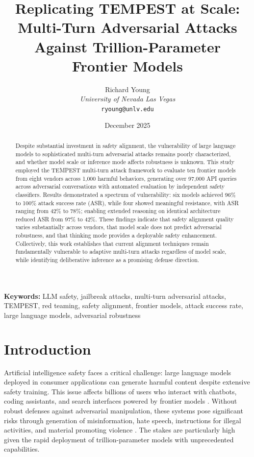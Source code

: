 \documentclass[11pt,a4paper]{article}
\title{\textbf{Replicating TEMPEST at Scale: Multi-Turn Adversarial Attacks Against Trillion-Parameter Frontier Models}}
\author{
Richard Young\\
\textit{University of Nevada Las Vegas}\\
\texttt{ryoung@unlv.edu}
}
\date{December 2025}
\begin{document}
\maketitle

\begin{abstract}
Despite substantial investment in safety alignment, the vulnerability of large language models to sophisticated multi-turn adversarial attacks remains poorly characterized, and whether model scale or inference mode affects robustness is unknown. This study employed the TEMPEST multi-turn attack framework to evaluate ten frontier models from eight vendors across 1,000 harmful behaviors, generating over 97,000 API queries across adversarial conversations with automated evaluation by independent safety classifiers. Results demonstrated a spectrum of vulnerability: six models achieved 96\% to 100\% attack success rate (ASR), while four showed meaningful resistance, with ASR ranging from 42\% to 78\%; enabling extended reasoning on identical architecture reduced ASR from 97\% to 42\%. These findings indicate that safety alignment quality varies substantially across vendors, that model scale does not predict adversarial robustness, and that thinking mode provides a deployable safety enhancement. Collectively, this work establishes that current alignment techniques remain fundamentally vulnerable to adaptive multi-turn attacks regardless of model scale, while identifying deliberative inference as a promising defense direction.
\end{abstract}

\vspace{0.5em}
\noindent\textbf{Keywords:} LLM safety, jailbreak attacks, multi-turn adversarial attacks, TEMPEST, red teaming, safety alignment, frontier models, attack success rate, large language models, adversarial robustness

\section{Introduction}

Artificial intelligence safety faces a critical challenge: large language models deployed in consumer applications can generate harmful content despite extensive safety training. This issue affects billions of users who interact with chatbots, coding assistants, and search interfaces powered by frontier models \cite{perez2022red, ganguli2022red}. Without robust defenses against adversarial manipulation, these systems pose significant risks through generation of misinformation, hate speech, instructions for illegal activities, and material promoting violence \cite{ouyang2022training, bai2022constitutional}. The stakes are particularly high given the rapid deployment of trillion-parameter models with unprecedented capabilities.
\end{document}
